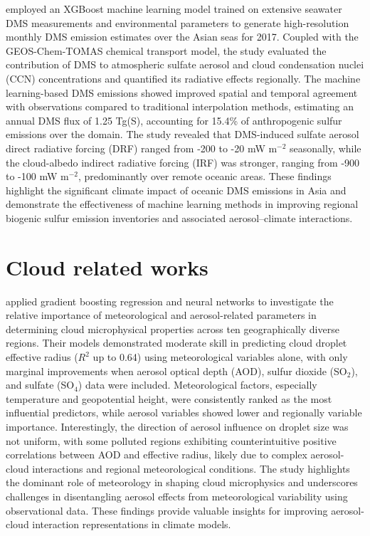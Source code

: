 \documentclass[11pt]{article}
\begin{document}
\citet{zhao2022simulating} employed an XGBoost machine learning model trained on extensive seawater DMS measurements and environmental parameters to generate high-resolution monthly DMS emission estimates over the Asian seas for 2017. Coupled with the GEOS-Chem-TOMAS chemical transport model, the study evaluated the contribution of DMS to atmospheric sulfate aerosol and cloud condensation nuclei (CCN) concentrations and quantified its radiative effects regionally. The machine learning-based DMS emissions showed improved spatial and temporal agreement with observations compared to traditional interpolation methods, estimating an annual DMS flux of 1.25 Tg(S), accounting for 15.4\% of anthropogenic sulfur emissions over the domain. The study revealed that DMS-induced sulfate aerosol direct radiative forcing (DRF) ranged from -200 to -20 mW m\(^{-2}\) seasonally, while the cloud-albedo indirect radiative forcing (IRF) was stronger, ranging from -900 to -100 mW m\(^{-2}\), predominantly over remote oceanic areas. These findings highlight the significant climate impact of oceanic DMS emissions in Asia and demonstrate the effectiveness of machine learning methods in improving regional biogenic sulfur emission inventories and associated aerosol–climate interactions.

\section{Cloud related works}
\citet{bender2024machine} applied gradient boosting regression and neural networks to investigate the relative importance of meteorological and aerosol-related parameters in determining cloud microphysical properties across ten geographically diverse regions. Their models demonstrated moderate skill in predicting cloud droplet effective radius (\( R^2 \) up to 0.64) using meteorological variables alone, with only marginal improvements when aerosol optical depth (AOD), sulfur dioxide (SO\(_2\)), and sulfate (SO\(_4\)) data were included. Meteorological factors, especially temperature and geopotential height, were consistently ranked as the most influential predictors, while aerosol variables showed lower and regionally variable importance. Interestingly, the direction of aerosol influence on droplet size was not uniform, with some polluted regions exhibiting counterintuitive positive correlations between AOD and effective radius, likely due to complex aerosol-cloud interactions and regional meteorological conditions. The study highlights the dominant role of meteorology in shaping cloud microphysics and underscores challenges in disentangling aerosol effects from meteorological variability using observational data. These findings provide valuable insights for improving aerosol-cloud interaction representations in climate models.
\end{document}
